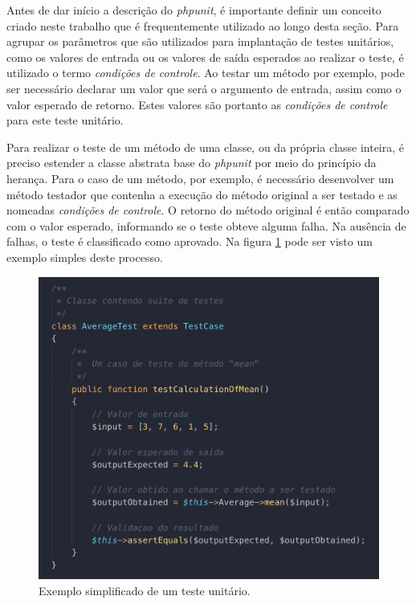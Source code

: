 Antes de dar início a descrição do \emph{phpunit}, é importante definir um conceito criado neste trabalho que é frequentemente utilizado ao longo desta seção. Para agrupar os parâmetros que são utilizados para implantação de testes unitários, como os valores de entrada ou os valores de saída esperados ao realizar o teste, é utilizado o termo \emph{condições de controle}. Ao testar um método por exemplo, pode ser necessário declarar um valor que será o argumento de entrada, assim como o valor esperado de retorno. Estes valores são portanto as \emph{condições de controle} para este teste unitário.

Para realizar o teste de um método de uma classe, ou da própria classe inteira, é preciso estender a classe abstrata base do \emph{phpunit} por meio do princípio da herança. Para o caso de um método, por exemplo, é necessário desenvolver um método testador que contenha a execução do método original a ser testado e as nomeadas \emph{condições de controle}. O retorno do método original é então comparado com o valor esperado, informando se o teste obteve alguma falha. Na ausência de falhas, o teste é classificado como aprovado. Na figura \ref{fig:phpunit-framework} pode ser visto um exemplo simples deste processo.

\begin{figure}[H]
    \centering
    \includegraphics[width=13cm]{source/4-solucao/images/phpunit-framework.png}
    \caption{Exemplo simplificado de um teste unitário.}
    \label{fig:phpunit-framework}
\end{figure}

